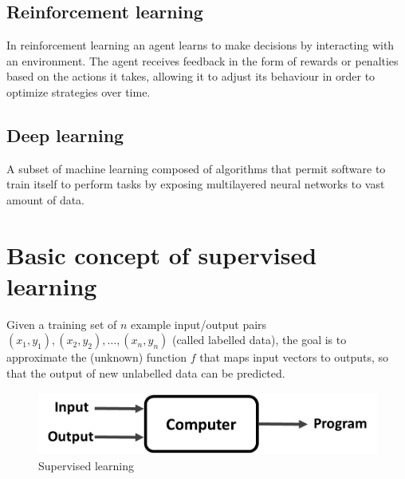 \documentclass[a4paper,12pt,answers]{article}
\begin{document}
	\subsection{Reinforcement learning}
	In reinforcement learning an agent learns to make decisions by interacting with an environment. The agent receives feedback in the form of rewards or penalties based on the actions it takes, allowing it to adjust its behaviour in order to optimize strategies over time.
	
	\subsection{Deep learning}
	A subset of machine learning composed of algorithms that permit software to train itself to perform tasks by exposing multilayered neural networks to vast amount of data.


	
	\section{Basic concept of supervised learning}
	Given a training set of $n$ example input/output pairs $(x_1,y_1), (x_2,y_2), \dots, (x_n, y_n)$ (called labelled data), the goal is to approximate the (unknown) function $f$ that maps input vectors to outputs, so that the output of new unlabelled data can be predicted.
	
	\begin{figure}[H]
		\centering
		\includegraphics[width=0.7\linewidth]{supervised_learning}
		\caption{Supervised learning}
		\label{fig:supervisedlearning}
	\end{figure}
	
	
	
\end{document}
